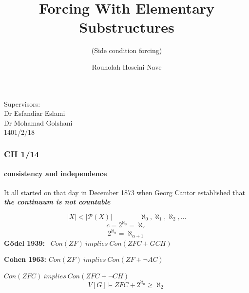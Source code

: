 \documentclass{beamer}
\begin{document}
\title{Forcing With Elementary Substructures}
\subtitle{{\small (Side condition forcing)}}
\author{Rouholah Hoseini Nave}
\begin{frame}
\maketitle
\begin{center}
Supervisors:\\
Dr Esfandiar Eslami\\
Dr Mohamad Golshani \\
\vspace{10mm}
1401/2/18
\end{center}
\end{frame}
\begin{frame}
\frametitle{CH  \hspace{103mm}1/14}
\framesubtitle{consistency and independence}
It all started on that day in December 1873 when Georg Cantor established that \textit{\textbf{{\large the continuum is not countable}}}

$$|X| < |\mathcal{P}(X)| \qquad \qquad \aleph_0, \aleph_1, \aleph_2, \dots$$
\pause
$$c= 2^{\aleph_0} = \aleph_?$$
$$2^{\aleph_{\alpha}}= \aleph_{\alpha+1}$$
\pause
\textbf{G\"{o}del 1939:} \ $Con(ZF) \ implies \ Con(ZFC + GCH)$
\vspace{5mm}

\textbf{Cohen 1963:} $ Con(ZF) \ implies \ Con(ZF + \neg AC)$

\hspace{25.5mm}$Con(ZFC) \ implies \ Con(ZFC + \neg CH)$
$$V[G] \models ZFC + 2^{\aleph_0}\geq \aleph_2$$
\end{frame}
\end{document}

